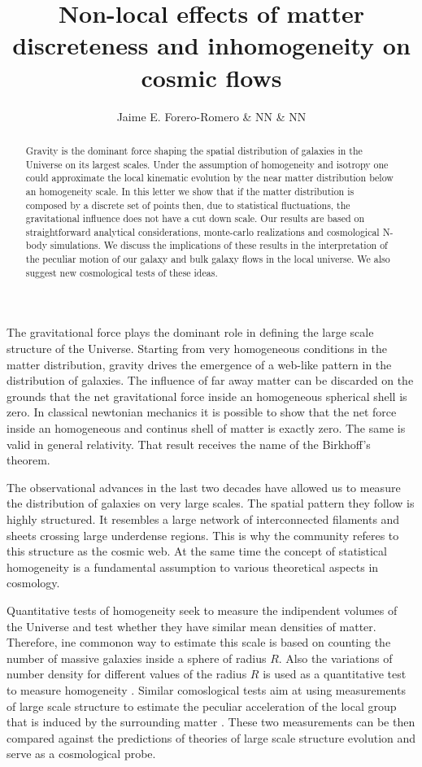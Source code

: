\documentclass{article}
\title{Non-local effects of matter discreteness and inhomogeneity on
  cosmic flows}  \author{Jaime E. Forero-Romero \& NN \& NN}
\begin{document}
\maketitle
\begin{abstract}

Gravity is the dominant force shaping the spatial distribution of galaxies in
the Universe on its largest scales. Under the assumption of
homogeneity and isotropy one could approximate the local
kinematic evolution by the near matter distribution below an
homogeneity scale. In this letter we show that if the matter
distribution is composed by a discrete set of points then, due to
statistical fluctuations, the gravitational influence does not have a
cut down scale. Our results are based on straightforward
analytical considerations, monte-carlo realizations and cosmological
N-body simulations. We discuss the implications of these results in
the interpretation of the peculiar motion of our galaxy and bulk
galaxy flows in the local universe. We also suggest new cosmological
tests of these ideas. 



\end{abstract}

The gravitational force plays the dominant role in
defining the large scale structure of the Universe. Starting from very
homogeneous conditions in the matter distribution, gravity drives the emergence
of a web-like pattern in the distribution of galaxies. The influence of
far away matter can be discarded on the grounds that the net
gravitational force inside an homogeneous spherical shell is zero. In
classical newtonian mechanics it is possible to show that the net
force inside an homogeneous and continus shell of matter is exactly
zero. The same is valid in general relativity. That result receives
the name of the Birkhoff's theorem.  

The observational advances in the last two decades have allowed us
to measure the distribution of galaxies on very large scales. The
spatial pattern they follow is highly structured. It resembles a
large network of interconnected filaments and sheets crossing large
underdense regions.  This is why the community referes to this
structure as the cosmic web. At the same time the concept of
statistical homogeneity is a fundamental assumption to various
theoretical aspects in cosmology. 

Quantitative tests of homogeneity seek to measure the indipendent
volumes of the Universe and test whether they have similar mean
densities of matter. Therefore, ine commonon way to estimate this
scale is based on counting the number of massive galaxies inside a
sphere of radius $R$. Also the variations of number density for
different values of the radius $R$ is used as a quantitative test to
measure homogeneity \cite{Hogg2005}. 
Similar comoslogical tests aim at using measurements of large scale
structure to estimate the peculiar acceleration of the local group
that is induced by the surrounding matter
\cite{Gibelyou2012,Bilicki2012}. These two measurements can be then
compared against the predictions of theories of large scale structure
evolution and serve as a cosmological probe. 
\end{document}
